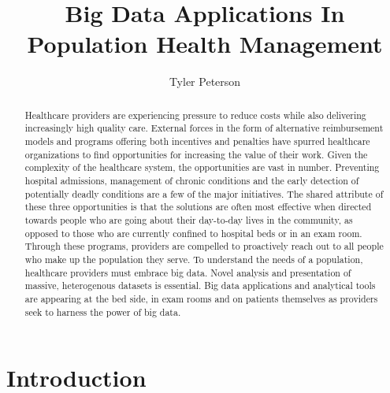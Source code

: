 \documentclass[sigconf]{acmart}
\begin{document}
\title{Big Data Applications In Population Health Management}


\author{Tyler Peterson}



\renewcommand{\shortauthors}{B. Trovato et al.}


\begin{abstract}

  Healthcare providers are experiencing pressure to reduce costs while also delivering increasingly high quality care. External forces in the form of alternative reimbursement models and programs offering both incentives and penalties have spurred healthcare organizations to find opportunities for increasing the value of their work. Given the complexity of the healthcare system, the opportunities are vast in number. Preventing hospital admissions, management of chronic conditions and the early detection of potentially deadly conditions are a few of the major initiatives. The shared attribute of these three opportunities is that the solutions are often most effective when directed towards people who are going about their day-to-day lives in the community, as opposed to those who are currently confined to hospital beds or in an exam room. Through these programs, providers are compelled to proactively reach out to all people who make up the population they serve. To understand the needs of a population, healthcare providers must embrace big data. Novel analysis and presentation of massive, heterogenous datasets is essential. Big data applications and analytical tools are appearing at the bed side, in exam rooms and on patients themselves as providers seek to harness the power of big data.
  
\end{abstract}



\maketitle

\section{Introduction}
\end{document}
